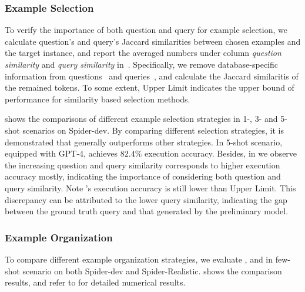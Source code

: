 \subsubsection{Example Selection}
To verify the importance of both question and query for example selection, we calculate question's and query's Jaccard similarities between chosen examples and the target instance, and report the averaged numbers under column \emph{question similarity} and \emph{query similarity} in~. 
Specifically, we remove database-specific information from questions~\cite{rat-sql} and queries~\cite{li2023resdsql}, and calculate the Jaccard similaritis of the remained tokens. 
To some extent, Upper Limit indicates the upper bound of performance for similarity based selection methods. 

 shows the comparisons of different example selection strategies in 1-, 3- and 5-shot scenarios on Spider-dev.
By comparing different selection strategies, it is demonstrated that \abpqsselector generally outperforms other strategies. 
In 5-shot scenario, equipped with GPT-4, \ours achieves $82.4\%$ execution accuracy. 
Besides, in  we observe the increasing question and query similarity corresponds to higher execution accuracy mostly, indicating the importance of considering both question and query similarity. 
Note \abpqsselector's execution accuracy is still lower than Upper Limit. 
This discrepancy can be attributed to the lower query similarity, indicating the gap between the ground truth query and that generated by the preliminary model. 

\subsubsection{Example Organization}

To compare different example organization strategies, we evaluate \fiorg, \sqlorg and \pairorg in few-shot scenario on both Spider-dev and Spider-Realistic. 
 shows the comparison results, and refer to  for detailed numerical results. 

